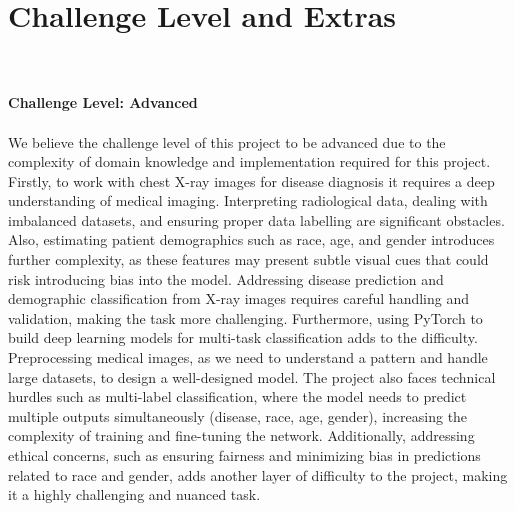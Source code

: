 \documentclass{article}
\begin{document}
\section{Challenge Level and Extras}


\\ \\ 
\textbf{Challenge Level: Advanced} \\ \\ 
We believe the challenge level of this project to be advanced due to the complexity of domain knowledge and implementation required for this project. Firstly, to work with chest X-ray images for disease diagnosis it requires a deep understanding of medical imaging. Interpreting radiological data, dealing with imbalanced datasets, and ensuring proper data labelling are significant obstacles. Also, estimating patient demographics such as race, age, and gender introduces further complexity, as these features may present subtle visual cues that could risk introducing bias into the model. Addressing disease prediction and demographic classification from X-ray images requires careful handling and validation, making the task more challenging.
Furthermore, using PyTorch to build deep learning models for multi-task classification adds to the difficulty. Preprocessing medical images, as we need to understand a pattern and handle large datasets, to design a well-designed model. The project also faces technical hurdles such as multi-label classification, where the model needs to predict multiple outputs simultaneously (disease, race, age, gender), increasing the complexity of training and fine-tuning the network. Additionally, addressing ethical concerns, such as ensuring fairness and minimizing bias in predictions related to race and gender, adds another layer of difficulty to the project, making it a highly challenging and nuanced task.
\end{document}
